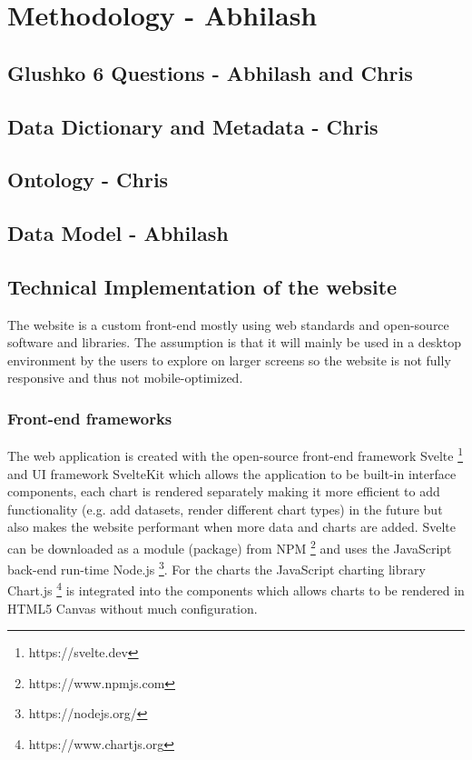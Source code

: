 \section {Methodology - Abhilash}

\subsection{Glushko 6 Questions - Abhilash and Chris}

\subsection{Data Dictionary and Metadata - Chris}

\subsection{Ontology - Chris} 

\subsection{Data Model - Abhilash} 

\subsection{Technical Implementation of the website}

The website is a custom front-end mostly using web standards and open-source software and libraries. The assumption is that it will mainly be used in a desktop environment by the users to explore on larger screens so the website is not fully responsive and thus not mobile-optimized. 

\subsubsection{Front-end frameworks}
The web application is created with the open-source front-end framework Svelte \footnote{https://svelte.dev} and UI framework SvelteKit which allows the application to be built-in interface components, each chart is rendered separately making it more efficient to add functionality (e.g. add datasets, render different chart types) in the future but also makes the website performant when more data and charts are added. Svelte can be downloaded as a module (package) from NPM \footnote{https://www.npmjs.com} and uses the JavaScript back-end run-time Node.js \footnote{https://nodejs.org/}. For the charts the JavaScript charting library Chart.js \footnote{https://www.chartjs.org} is integrated into the components which allows charts to be rendered in HTML5 Canvas without much configuration. 

